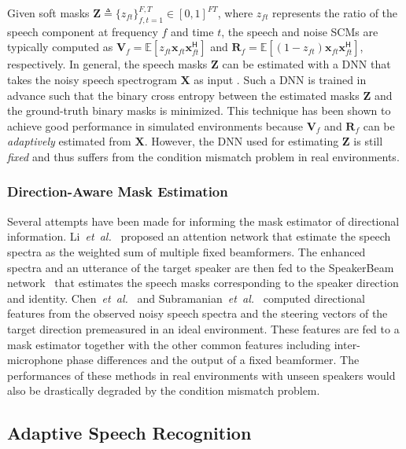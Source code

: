 \documentclass[a4paper]{article}
\newcommand{\R}{\R}
\newcommand{\etal}{\textit{et~al.}}
\def\hr{\mathsf{H}}
\def\R{\mathbf{R}}
\def\V{\mathbf{V}}
\def\X{\mathbf{X}}
\def\Z{\mathbf{Z}}
\def\x{\mathbf{x}}
\begin{document}
Given soft masks $\Z \!\triangleq\! \{z_{ft}\}_{f,t=1}^{F,T} \!\in\! [0, 1]^{FT}$,
 where $z_{ft}$ represents the ratio of the speech component
 at frequency $f$ and time $t$, 
 the speech and noise SCMs are typically computed as
$\V_f \!=\! \mathbb{E}\!\left[z_{ft} \x_{ft} \x_{ft}^\hr\right]$ and
$\R_f \!=\! \mathbb{E}\!\left[(1 - z_{ft}) \x_{ft} \x_{ft}^\hr\right]$, respectively.
In general, 
 the speech masks $\Z$ can be estimated 
 with a DNN that takes the noisy speech spectrogram $\X$ as input
 \cite{heymann_neural_2016,erdogan_improved_2016}.
Such a DNN is trained in advance such that the binary cross entropy 
 between the estimated masks $\Z$ and
 the ground-truth binary masks 
 is minimized.
This technique has been shown to achieve good performance
 in simulated environments
 because $\V_f$ and $\R_f$ can be \textit{adaptively} estimated from $\X$.
However,
 the DNN used for estimating $\Z$ is still \textit{fixed}
 and thus suffers from the condition mismatch problem
 in real environments.

\subsubsection{Direction-Aware Mask Estimation}

Several attempts have been made 
 for informing the mask estimator of directional information.
Li~\etal~\cite{Li2019} proposed an attention network 
 that estimate the speech spectra as the weighted sum of multiple fixed beamformers.
The enhanced spectra and an utterance of the target speaker
 are then fed to the SpeakerBeam network~\cite{8268910}
 that estimates the speech masks corresponding to the speaker direction and identity.
Chen~\etal~\cite{8639593} and Subramanian~\etal~\cite{subramanian_far-field_2020}
 computed directional features
 from the observed noisy speech spectra
 and the steering vectors of the target direction premeasured in an ideal environment.
These features are fed to a mask estimator
 together with the other common features 
 including inter-microphone phase differences and the output of a fixed beamformer.
The performances of these methods in real environments with unseen speakers
 would also be drastically degraded by the condition mismatch problem.

\subsection{Adaptive Speech Recognition}
\end{document}

